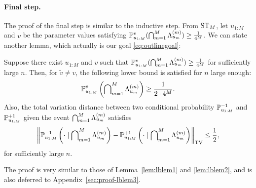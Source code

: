 \paragraph{Final step.}
The proof of the final step is similar to the inductive step.
From $\textup{ST}_M$, let $u_{1:M}$ and $v$ be the parameter values 
satisfying $\mathbb{P}_{u_{1:M}}^v (\bigcap_{m=1}^{M} \Lambda_{u_{m}}^{({m})} ) \geq \frac{1}{4^{M}}$.
We can state another lemma, which actually is our goal \eqref{eq:outlinegoal}:
\begin{lemma}
	\label{lem:lblem3}
	Suppose there exist $u_{1:M}$ and $v$ 
	such that $\mathbb{P}_{u_{1:M}}^v (\bigcap_{m=1}^{M} \Lambda_{u_{m}}^{({m})} ) \geq \frac{1}{4^{M}}$ for sufficiently large $n$.
	Then, for $\tilde v \neq v$, the following lower bound is satisfied for $n$ large enough:
	\begin{equation}
	\label{eqn:lblem3eq1}
	\mathbb{P}_{u_{1:M}}^{\tilde v} \left (\bigcap\nolimits_{m=1}^{M} \Lambda_{u_{m}}^{({m})}  \right ) \geq \frac{1}{2 \cdot 4^{M}}.
	\end{equation}
	Also, the total variation distance between two conditional probability $\mathbb{P}_{u_{1:M}}^{-1}$ and $\mathbb{P}_{u_{1:M}}^{+1}$ 
	given the event $\bigcap\nolimits_{m=1}^{M} \Lambda_{u_{m}}^{({m})}$ satisfies
	\begin{equation}
	\label{eqn:lblem3eq2}
	\tvnorm{ \probuvm \left (\cdot \mid \bigcap\nolimits_{m=1}^{M} \EvSmSplm \right ) -
		\probuvp \left (\cdot \mid \bigcap\nolimits_{m=1}^{M} \EvSmSplm \right ) } \leq \frac{1}{2},
	\end{equation}
	for sufficiently large $n$.
\end{lemma}
The proof is very similar to those of Lemma~\ref{lem:lblem1} and \ref{lem:lblem2}, and is also deferred to Appendix~\ref{sec:proof-lblem3}.


